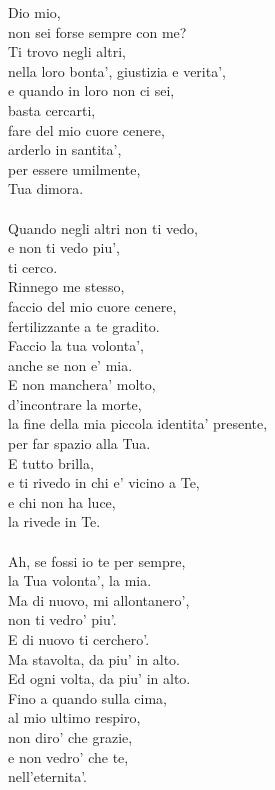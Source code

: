 \begin{haiku}
    Dio mio,\\
    non sei forse sempre con me?\\
    Ti trovo negli altri,\\
    nella loro bonta', giustizia e verita',\\
    e quando in loro non ci sei,\\
    basta cercarti,\\
    fare del mio cuore cenere,\\
    arderlo in santita',\\
    per essere umilmente,\\
    Tua dimora.\\
    \leavevmode\\
    Quando negli altri non ti vedo,\\
    e non ti vedo piu',\\
    ti cerco.\\
    Rinnego me stesso,\\
    faccio del mio cuore cenere,\\
    fertilizzante a te gradito.\\
    Faccio la tua volonta',\\
    anche se non e' mia.\\
    E non manchera' molto,\\
    d'incontrare la morte,\\
    la fine della mia piccola identita' presente,\\
    per far spazio alla Tua.\\
    E tutto brilla,\\
    e ti rivedo in chi e' vicino a Te,\\
    e chi non ha luce,\\
    la rivede in Te.\\
    \leavevmode\\
    Ah, se fossi io te per sempre,\\
    la Tua volonta', la mia.\\
    Ma di nuovo, mi allontanero',\\
    non ti vedro' piu'.\\
    E di nuovo ti cerchero'.\\
    Ma stavolta, da piu' in alto.\\
    Ed ogni volta, da piu' in alto.\\
    Fino a quando sulla cima,\\
    al mio ultimo respiro,\\
    non diro' che grazie,\\
    e non vedro' che te,\\
    nell'eternita'.\\
\end{haiku}


